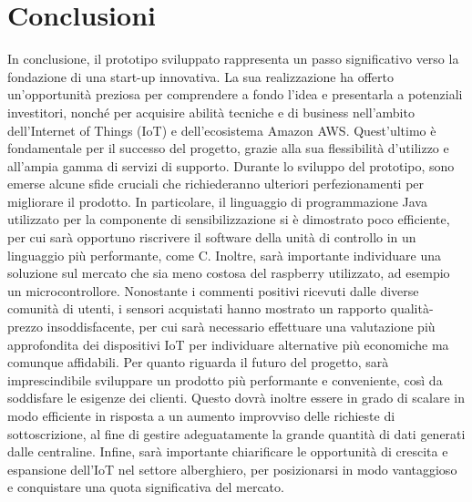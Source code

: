 \section{Conclusioni}
In conclusione, il prototipo sviluppato rappresenta un passo significativo verso la fondazione di una start-up innovativa. La sua realizzazione ha offerto un'opportunità preziosa per comprendere a fondo l'idea e presentarla a potenziali investitori, nonché per acquisire abilità tecniche e di business nell'ambito dell'Internet of Things (IoT) e dell'ecosistema Amazon AWS. Quest'ultimo è fondamentale per il successo del progetto, grazie alla sua flessibilità d'utilizzo e all'ampia gamma di servizi di supporto.
%
Durante lo sviluppo del prototipo, sono emerse alcune sfide cruciali che richiederanno ulteriori perfezionamenti per migliorare il prodotto. In particolare, il linguaggio di programmazione Java utilizzato per la componente di sensibilizzazione si è dimostrato poco efficiente, per cui sarà opportuno riscrivere il software della unità di controllo in un linguaggio più performante, come C. Inoltre, sarà importante individuare una soluzione sul mercato che sia meno costosa del raspberry utilizzato, ad esempio un microcontrollore.
%
Nonostante i commenti positivi ricevuti dalle diverse comunità di utenti, i sensori acquistati hanno mostrato un rapporto qualità-prezzo insoddisfacente, per cui sarà necessario effettuare una valutazione più approfondita dei dispositivi IoT per individuare alternative più economiche ma comunque affidabili.
%
Per quanto riguarda il futuro del progetto, sarà imprescindibile sviluppare un prodotto più performante e conveniente, così da soddisfare le esigenze dei clienti. Questo dovrà inoltre essere in grado di scalare in modo efficiente in risposta a un aumento improvviso delle richieste di sottoscrizione, al fine di gestire adeguatamente la grande quantità di dati generati dalle centraline.
%
Infine, sarà importante chiarificare le opportunità di crescita e espansione dell'IoT nel settore alberghiero, per posizionarsi in modo vantaggioso e conquistare una quota significativa del mercato.